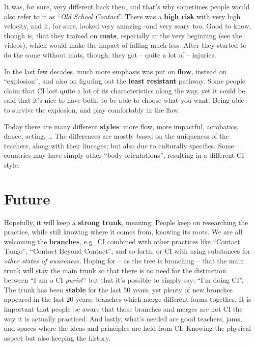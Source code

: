 It was, for sure, very different back then, and that's why sometimes people would also refer to it as ``\textit{Old School Contact}''.
There was a \textbf{high risk} with very high velocity, and it, for sure, looked very amazing -and very scary too.
Good to know, though is, that they trained on \textbf{mats}, especially at the very beginning (see the videos), which would make the impact of falling much less.
After they started to do the same without mats, though, they got -- quite a lot of -- injuries.

In the last few decades, much more emphasis was put on \textbf{flow}, instead on ``explosion'', and also on figuring out the \textbf{least resistant} pathway.
Some people claim that CI lost quite a lot of its characteristics along the way, yet it could be said that it's nice to have both, to be able to choose what you want.
Being able to survive the explosion, and play comfortably in the flow.

Today there are many different \textbf{styles}: more flow, more impactful, acrobatics, dance, acting, \ldots
The differences are mostly based on the uniqueness of the teachers, along with their lineages; but also due to culturally specifics.
Some countries may have simply other ``body orientations'', resulting in a different CI style.

\section{Future}\label{sec:future}

Hopefully, it will keep a \textbf{strong trunk}, meaning: People keep on researching the practice, while still knowing where it comes from, knowing its roots.
We are all welcoming the \textbf{branches}, e.g.\ CI combined with other practices like ``Contact Tango'', ``Contact Beyond Contact'', and so forth, or CI with using substances for \textit{other states of awareness}.
Hoping for -- as the tree is branching -- that the main trunk will stay the main trunk so that there is no need for the distinction between ``I am a CI \textit{purist}'' but that it's possible to simply say: ``I'm doing CI''.
The trunk has been \textbf{stable} for the last 50 years, yet plenty of new branches appeared in the last 20 years; branches which merge different forms together.
It is important that people be aware that those branches and merges are not CI the way it is actually practiced.
And lastly, what's needed are good teachers, jams, and spaces where the ideas and principles are held from CI: Knowing the physical aspect but also keeping the history.
